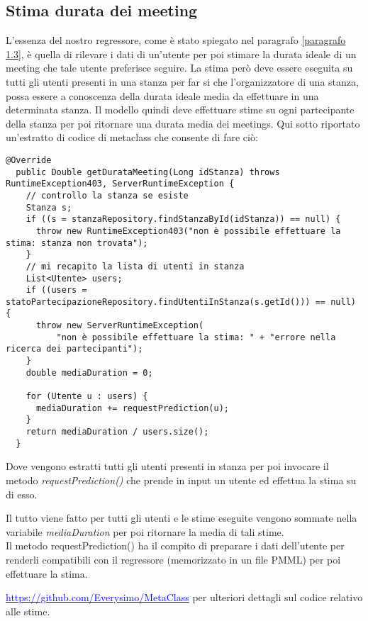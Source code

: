 \subsection{Stima durata dei meeting}
\fancyhead{}    %
\label{paragrafo 5.1}

L'essenza del nostro regressore, come è stato spiegato nel paragrafo \ref{paragrafo 1.3}, è quella di rilevare i dati di un'utente per poi stimare la durata ideale di un meeting che tale utente preferisce seguire.
La stima però deve essere eseguita su tutti gli utenti presenti in una stanza per far si che l'organizzatore di una stanza, possa essere a conoscenza della durata ideale media da effettuare in una determinata stanza.
Il modello quindi deve effettuare stime su ogni partecipante della stanza per poi ritornare una durata media dei meetings. Qui sotto riportato un'estratto di codice di metaclass che consente di fare ciò: \\
\begin{lstlisting}[caption=Stima durata meeting ideale]
  @Override
  public Double getDurataMeeting(Long idStanza) throws RuntimeException403, ServerRuntimeException {
    // controllo la stanza se esiste
    Stanza s;
    if ((s = stanzaRepository.findStanzaById(idStanza)) == null) {
      throw new RuntimeException403("non è possibile effettuare la stima: stanza non trovata");
    }
    // mi recapito la lista di utenti in stanza
    List<Utente> users;
    if ((users = statoPartecipazioneRepository.findUtentiInStanza(s.getId())) == null) {
      throw new ServerRuntimeException(
          "non è possibile effettuare la stima: " + "errore nella ricerca dei partecipanti");
    }
    double mediaDuration = 0;

    for (Utente u : users) {
      mediaDuration += requestPrediction(u);
    }
    return mediaDuration / users.size();
  }
\end{lstlisting}
Dove vengono estratti tutti gli utenti presenti in stanza per poi invocare il metodo \textit{requestPrediction()}
che prende in input un utente ed effettua la stima su di esso.

Il tutto viene fatto per tutti gli utenti e le stime eseguite vengono sommate nella variabile \textit{mediaDuration} per poi ritornare la media di tali stime. \\
Il metodo requestPrediction() ha il compito di preparare i dati dell'utente per renderli compatibili con il regressore (memorizzato in un file PMML) per poi effettuare la stima. 


\href{https://github.com/Everysimo/MetaClass}{\textcolor{blue}{https://github.com/Everysimo/MetaClass}} per ulteriori dettagli sul codice relativo alle stime.